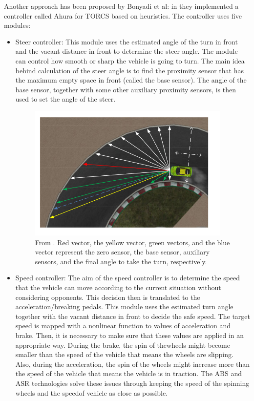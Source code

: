 Another approach has been proposed by Bonyadi et al: in \cite{ahura} they implemented a controller called Ahura for TORCS based on heuristics.
The controller uses five modules: 
\begin{itemize}
\item Steer controller: This module uses the estimated angle
of the turn in front and the vacant distance in front to determine the steer angle. The module can control how smooth or sharp the vehicle is going to turn.
The main idea behind calculation of the steer angle is to find the proximity sensor that has the maximum empty space in front (called the base sensor). The angle of the base sensor, together with some other auxiliary proximity sensors, is then used to set the angle of the steer.
\begin{figure}
 \centering
  \captionsetup{width=10cm}
  \includegraphics[width=10cm]{./img/ahura-steer}
  \caption{From \cite{ahura}. Red vector, the yellow vector, green vectors, and the blue vector represent the zero sensor, the base sensor, auxiliary sensors, and the final angle to take the turn, respectively.}
\end{figure}
\item Speed controller: The aim of the speed controller is to determine the speed that the vehicle can move according to the current situation without considering opponents. This decision then is translated to the acceleration/breaking pedals. This module uses the estimated turn angle together with the vacant distance in front to decide the safe speed.
The target speed is mapped with a nonlinear function to values of acceleration and brake. Then, it is necessary to make sure that these values are applied in an appropriate way.  During the brake, the spin of thewheels might become smaller than the speed of the vehicle that
means the wheels are slipping. Also, during the acceleration, the spin of the wheels might increase more than the speed of the vehicle that means the vehicle is in traction. The ABS and ASR technologies solve these issues through keeping the speed of the spinning wheels and the speedof vehicle as close as possible.

\end{itemize}
